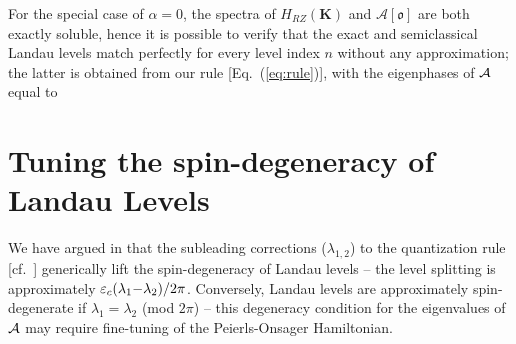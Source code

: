 \documentclass[aps, prb, showpacs, twocolumn, notitlepage, superscriptaddress]{revtex4-1}
\begin{document}
For the special case of $\alpha{=}0$, the spectra of $H_{RZ}(\boldsymbol{K})$ and $\mathcal{A}[\mathfrak{o}]$ are both exactly soluble, hence it is possible to verify that the exact and semiclassical Landau levels match perfectly for every level index $n$ without any approximation; the latter is obtained from our rule [Eq.\ (\ref{eq:rule})], with the eigenphases of ${\cal A}$ equal to 







\section{Tuning the spin-degeneracy of Landau Levels}\label{sec:llquasideg}

We have argued in  that the subleading corrections ($\lambda_{1,2}$) to the quantization rule [cf.\ ] generically lift the spin-degeneracy of Landau levels -- the level splitting is approximately $\varepsilon_c(\lambda_1{-}\lambda_2)/2\pi$. Conversely, Landau levels are approximately spin-degenerate if $\lambda_1{=}\lambda_2$ (mod $2\pi$) -- this degeneracy condition for the eigenvalues of ${\cal A}$ may require fine-tuning of the Peierls-Onsager Hamiltonian.  
\end{document}
